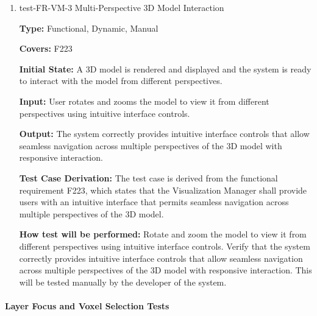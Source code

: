 \documentclass[12pt, titlepage]{article}
\begin{document}
\begin{enumerate}
\textbf{Test Case Derivation:} The test case is derived from the functional requirement F222, which states that the Visualization Manager shall provide users with simplistic navigation across user-manageable display sections to ensure access to all model partitions.
					
\textbf{How test will be performed:} Navigate between model partitions by clicking on the different display sections of the model. Verify that the system correctly provides smooth navigation between partitions, allowing users to access all model sections without performance degradation. This will be tested manually by the developer of the system.

\item{test-FR-VM-3 Multi-Perspective 3D Model Interaction\\}
\label{sec:t-vm-3}

\textbf{Type:} Functional, Dynamic, Manual

\textbf{Covers:} F223
					
\textbf{Initial State:} A 3D model is rendered and displayed and the system is ready to interact with the model from different perspectives.
					
\textbf{Input:} User rotates and zooms the model to view it from different perspectives using intuitive interface controls.
					
\textbf{Output:} The system correctly provides intuitive interface controls that allow seamless navigation across multiple perspectives of the 3D model with responsive interaction.

\textbf{Test Case Derivation:} The test case is derived from the functional requirement F223, which states that the Visualization Manager shall provide users with an intuitive interface that permits seamless navigation across multiple perspectives of the 3D model.
					
\textbf{How test will be performed:} Rotate and zoom the model to view it from different perspectives using intuitive interface controls. Verify that the system correctly provides intuitive interface controls that allow seamless navigation across multiple perspectives of the 3D model with responsive interaction. This will be tested manually by the developer of the system.

\end{enumerate}

\paragraph{Layer Focus and Voxel Selection Tests}
\end{document}
